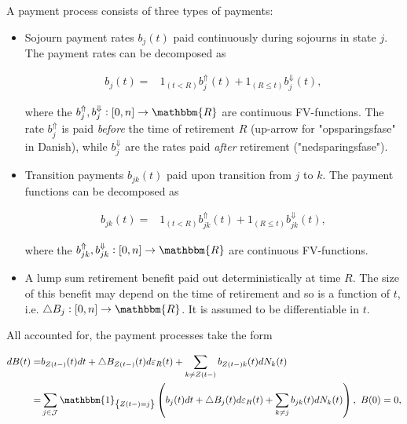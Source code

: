 \documentclass{article}
\newcommand{\1}[1]{\mathbbm{1}_{\left\lbrace #1 \right\rbrace}}
\theoremstyle{break}
\theoremstyle{remark}
\numberwithin{equation}{section}
\begin{document}
A payment process consists of three types of payments:

\begin{itemize}
    \item Sojourn payment rates $b_j(t)$ paid continuously during sojourns in state $j$. The payment rates can be decomposed as
    
    \begin{align*}
        b_j(t) =& 1_{\left( t<R \right)} b_j^{\Uparrow}(t) + 1_{\left( R \leq t \right)} b_j^{\Downarrow}(t),
    \end{align*}
    
    where the $b_j^{\Uparrow}, b_j^{\Downarrow}: [0,n] \to \mathbbm{R}$ are continuous FV-functions. The rate $b_j^{\Uparrow}$ is paid \textit{before} the time of retirement $R$ (up-arrow for "opsparingsfase" in Danish), while $b_j^{\Downarrow}$ are the rates paid \textit{after} retirement ("nedsparingsfase").
    
    
    
    \item Transition payments $b_{jk}(t)$ paid upon transition from $j$ to $k$. The payment functions can be decomposed as
    
    \begin{align*}
        b_{jk}(t) =& 1_{\left( t<R \right)} b_{jk}^{\Uparrow}(t) + 1_{\left( R \leq t \right)} b_{jk}^{\Downarrow}(t),
    \end{align*}
    
    where the $b_{jk}^{\Uparrow}, b_{jk}^{\Downarrow}: [0,n] \to \mathbbm{R}$ are continuous FV-functions.
    
    
    
    \item A lump sum retirement benefit paid out deterministically at time $R$. The size of this benefit may depend on the time of retirement and so is a function of $t$, i.e. $\triangle B_j: [0,n] \to \mathbbm{R}$. It is assumed to be differentiable in $t$.
\end{itemize}

All accounted for, the payment processes take the form

\begin{align} \label{PaymentProcessDef}
\begin{split}
	    dB(t) =& b_{Z(t-)}(t)dt + \triangle B_{Z(t-)}(t) d \varepsilon_{R}(t) + \sum_{k \neq Z(t-)}b_{{Z(t-)}k}(t)dN_{k}(t) \\
    =& \sum_{j \in \mathcal{J}} \1{Z(t-)=j} \left( b_j(t)dt + \triangle B_j(t) d \varepsilon_{R}(t) + \sum_{k \neq j}b_{jk}(t)dN_{k}(t) \right), \, \, B(0) = 0,
\end{split}
\end{align}
\end{document}
